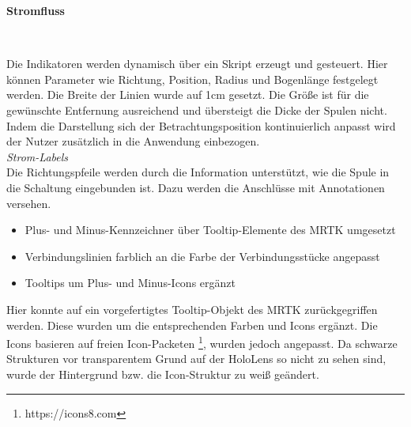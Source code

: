 \textbf{Stromfluss}
\vspace{4px}
\begin{center}
	\\
\end{center}
\vspace{6px}

Die Indikatoren werden dynamisch über ein Skript erzeugt und gesteuert. Hier können Parameter wie Richtung, Position, Radius und Bogenlänge festgelegt werden. Die Breite der Linien wurde auf 1cm gesetzt. Die Größe ist für die gewünschte Entfernung ausreichend und übersteigt die Dicke der Spulen nicht. Indem die Darstellung sich der Betrachtungsposition kontinuierlich anpasst wird der Nutzer zusätzlich in die Anwendung einbezogen.\\

\textit{Strom-Labels}\\
Die Richtungspfeile werden durch die Information unterstützt, wie die Spule in die Schaltung eingebunden ist. Dazu werden die Anschlüsse mit Annotationen versehen.
\begin{itemize}
	\setlength{\itemsep}{-1pt}
	\singlespacing
	\item Plus- und Minus-Kennzeichner über Tooltip-Elemente des MRTK umgesetzt
	\item Verbindungslinien farblich an die Farbe der Verbindungsstücke angepasst
	\item Tooltips um Plus- und Minus-Icons ergänzt
\end{itemize}

Hier konnte auf ein vorgefertigtes Tooltip-Objekt des MRTK zurückgegriffen werden. Diese wurden um die entsprechenden Farben und Icons ergänzt. Die Icons basieren auf freien Icon-Packeten \footnote{https://icons8.com}, wurden jedoch angepasst. Da schwarze Strukturen vor transparentem Grund auf der HoloLens so nicht zu sehen sind, wurde der Hintergrund bzw. die Icon-Struktur zu weiß geändert.\\

